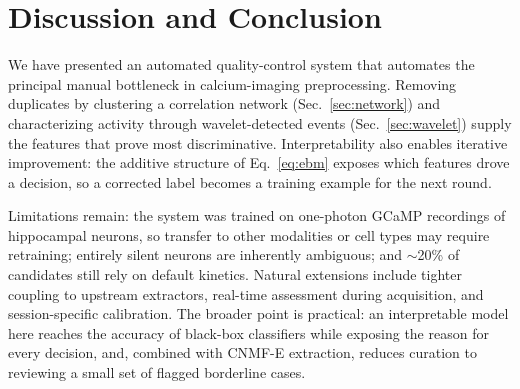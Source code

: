 \documentclass[conference]{IEEEtran}
\begin{document}
\section{Discussion and Conclusion}

We have presented an automated quality-control system that automates the principal manual bottleneck in calcium-imaging preprocessing. Removing duplicates by clustering a correlation network (Sec.~\ref{sec:network}) and characterizing activity through wavelet-detected events (Sec.~\ref{sec:wavelet}) supply the features that prove most discriminative. Interpretability also enables iterative improvement: the additive structure of Eq.~\ref{eq:ebm} exposes which features drove a decision, so a corrected label becomes a training example for the next round.

Limitations remain: the system was trained on one-photon GCaMP recordings of hippocampal neurons, so transfer to other modalities or cell types may require retraining; entirely silent neurons are inherently ambiguous; and $\sim$20\% of candidates still rely on default kinetics. Natural extensions include tighter coupling to upstream extractors, real-time assessment during acquisition, and session-specific calibration. The broader point is practical: an interpretable model here reaches the accuracy of black-box classifiers while exposing the reason for every decision, and, combined with CNMF-E extraction, reduces curation to reviewing a small set of flagged borderline cases.



\end{document}

